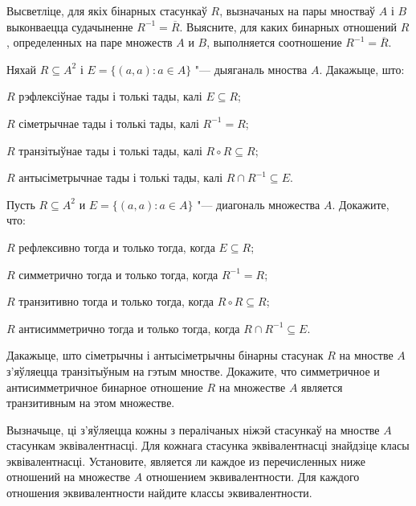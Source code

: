 \begin{problemList}
\problemItemSimple
{Высветліце, для якіх бінарных стасункаў $R$, вызначаных на пары мностваў $A$ і $B$ выконваецца судачыненне $R^{-1} = \overline{R}$.}
{Выясните, для каких бинарных отношений $R$, определенных на паре
множеств $A$ и $B$, выполняется соотношение $R^{-1} = \overline{R}$.}

\bigskip

\problemItemSimple
{%
Няхай $R \subseteq A^2$ і $E = \{(a, a) \colon a \in A\}$ "--- дыяганаль мноства $A$. Дакажыце, што:
\begin{belarusianEnumerate}
	\item $R$ рэфлексіўнае тады і толькі тады, калі $E \subseteq R$;
	\item $R$ сіметрычнае тады і толькі тады, калі $R^{-1} = R$;
	\item $R$ транзітыўнае тады і толькі тады, калі $R \circ R \subseteq R$;
	\item $R$ антысіметрычнае тады і толькі тады, калі $R \cap R^{-1} \subseteq E$.
\end{belarusianEnumerate}
}
{%
Пусть $R \subseteq A^2$ и $E = \{(a, a) \colon a \in A\}$ "--- диагональ множества $A$. Докажите, что:
\begin{russianEnumerate}
	\item $R$ рефлексивно тогда и только тогда, когда $E \subseteq R$;
	\item $R$ симметрично тогда и только тогда, когда $R^{-1} = R$;
	\item $R$ транзитивно тогда и только тогда, когда $R \circ R \subseteq R$;
	\item $R$ антисимметрично тогда и только тогда, когда $R \cap R^{-1} \subseteq E$.
\end{russianEnumerate}
}

\bigskip

\problemItemSimple
{Дакажыце, што сіметрычны і антысіметрычны бінарны стасунак $R$ на мностве $A$ з'яўляецца транзітыўным на гэтым мностве.}
{Докажите, что симметричное и антисимметричное бинарное отношение $R$ на множестве $A$ является транзитивным на этом множестве.}

\bigskip

\problemItemWithCommonPart
{Вызначыце, ці з'яўляецца кожны з пералічаных ніжэй стасункаў на мностве $A$ стасункам эквівалентнасці. Для кожнага стасунка эквівалентнасці знайдзіце класы эквівалентнасці.}
{Установите, является ли каждое из перечисленных ниже отношений на множестве $A$ отношением эквивалентности. Для каждого отношения эквивалентности найдите классы эквивалентности.}
{%
\begin{belarusianEnumerate}
	

\end{belarusianEnumerate}}
\end{problemList}
